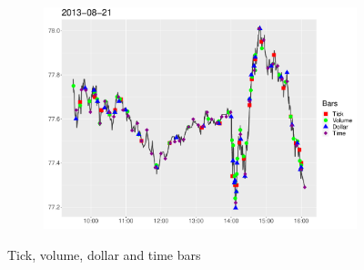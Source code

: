 \begin{figure}[htbp]
	\begin{subfigure}{\textwidth}
		\centering
		\includegraphics[scale=.25]{img/dataBars/sampling3}
	\end{subfigure}
	
	\caption{Tick, volume, dollar and time bars}
	\label{fig:dataBars}
\end{figure}

